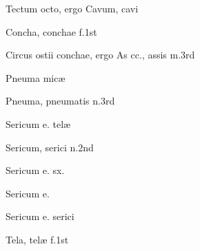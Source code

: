  {\mktsStyleItalic{}Tectum octo\/}, ergo {\mktsStyleItalic{}Cavum\/}, cavi


 {\mktsStyleItalic{}Concha\/}, conchae {\mktsStyleItalic{}f.1st\/}


 {\mktsStyleItalic{}Circus ostii conchae\/}, ergo {\mktsStyleItalic{}As cc.\/}, assis {\mktsStyleItalic{}m.3rd\/}


 {\mktsStyleItalic{}Pneuma micæ\/}


 {\mktsStyleItalic{}Pneuma\/}, pneumatis {\mktsStyleItalic{}n.3rd\/}


 {\mktsStyleItalic{}Sericum e. telæ\/}




 {\mktsStyleItalic{}Sericum\/}, serici {\mktsStyleItalic{}n.2nd\/}




 {\mktsStyleItalic{}Sericum e. sx.\/}


 {\mktsStyleItalic{}Sericum e.\/}


 {\mktsStyleItalic{}Sericum e. serici\/}


 {\mktsStyleItalic{}Tela\/}, telæ {\mktsStyleItalic{}f.1st\/}




